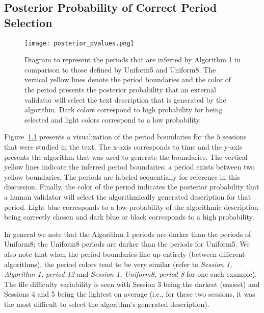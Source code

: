 \begin{appendices}

\chapter{Posterior Probability of Correct Period Selection}\label{cha:appendix1}
\begin{figure}
\centering
\texttt{[image: posterior\_pvalues.png]}
\caption{Diagram to represent the periods that are inferred by Algorithm 1 in comparison to those defined by Uniform5 and Uniform8. The vertical yellow lines denote the period boundaries and the color of the period presents the posterior probability that an external validator will select the text description that is generated by the algorithm. Dark colors correspond to high probability for being selected and light colors correspond to a low probability.}
\label{fig:posterior_pvalues}
\end{figure}

Figure~\ref{fig:posterior_pvalues} presents a visualization of the period boundaries for the $5$ sessions that were studied in the text. The x-axis corresponds to time and the y-axis presents the algorithm that was used to generate the boundaries. The vertical yellow lines indicate the inferred period boundaries; a period exists between two yellow boundaries. The periods are labeled sequentially for reference in this discussion. Finally, the color of the period indicates the posterior probability that a human validator will select the algorithmically generated description for that period. Light blue corresponds to a low probability of the algorithmic description being correctly chosen and dark blue or black corresponds to a high probability.

In general we note that the Algorithm 1 periods are darker than the periods of Uniform8; the Uniform8 periods are darker than the periods for Uniform5. We also note that when the period boundaries line up entirely (between different algorithms), the period colors tend to be very similar (refer to \textit{Session 1, Algorithm 1, period 12} and \textit{Session 1, Uniform8, period 8} for one such example). The file difficulty variability is seen with Session 3 being the darkest (easiest) and Sessions 4 and 5 being the lightest on average (i.e., for these two sessions, it was the most difficult to select the algorithm's generated description).


\end{appendices}
